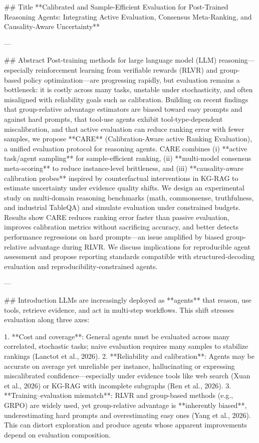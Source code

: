 ## Title
**Calibrated and Sample-Efficient Evaluation for Post-Trained Reasoning Agents: Integrating Active Evaluation, Consensus Meta-Ranking, and Causality-Aware Uncertainty**

---

## Abstract
Post-training methods for large language model (LLM) reasoning—especially reinforcement learning from verifiable rewards (RLVR) and group-based policy optimization—are progressing rapidly, but evaluation remains a bottleneck: it is costly across many tasks, unstable under stochasticity, and often misaligned with reliability goals such as calibration. Building on recent findings that group-relative advantage estimators are biased toward easy prompts and against hard prompts, that tool-use agents exhibit tool-type-dependent miscalibration, and that active evaluation can reduce ranking error with fewer samples, we propose **CARE** (Calibration-Aware active Ranking Evaluation), a unified evaluation protocol for reasoning agents. CARE combines (i) **active task/agent sampling** for sample-efficient ranking, (ii) **multi-model consensus meta-scoring** to reduce instance-level brittleness, and (iii) **causality-aware calibration probes** inspired by counterfactual interventions in KG-RAG to estimate uncertainty under evidence quality shifts. We design an experimental study on multi-domain reasoning benchmarks (math, commonsense, truthfulness, and industrial TableQA) and simulate evaluation under constrained budgets. Results show CARE reduces ranking error faster than passive evaluation, improves calibration metrics without sacrificing accuracy, and better detects performance regressions on hard prompts—an issue amplified by biased group-relative advantage during RLVR. We discuss implications for reproducible agent assessment and propose reporting standards compatible with structured-decoding evaluation and reproducibility-constrained agents.

---

## Introduction
LLMs are increasingly deployed as **agents** that reason, use tools, retrieve evidence, and act in multi-step workflows. This shift stresses evaluation along three axes:

1. **Cost and coverage**: General agents must be evaluated across many correlated, stochastic tasks; naive evaluation requires many samples to stabilize rankings (Lanctot et al., 2026).
2. **Reliability and calibration**: Agents may be accurate on average yet unreliable per instance, hallucinating or expressing miscalibrated confidence—especially under evidence tools like web search (Xuan et al., 2026) or KG-RAG with incomplete subgraphs (Ren et al., 2026).
3. **Training–evaluation mismatch**: RLVR and group-based methods (e.g., GRPO) are widely used, yet group-relative advantage is **inherently biased**, underestimating hard prompts and overestimating easy ones (Yang et al., 2026). This can distort exploration and produce agents whose apparent improvements depend on evaluation composition.

